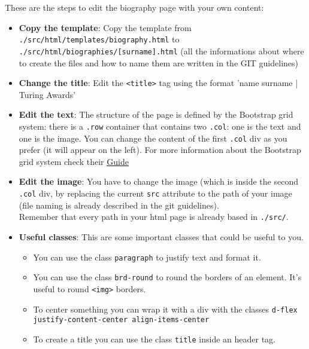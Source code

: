 \documentclass[a4paper,12pt]{article}
\newcommand{\<}{\textless}
\renewcommand{\>}{\textgreater}
\begin{document}
These are the steps to edit the biography page with your own content:
\begin{itemize}
 \item \textbf{Copy the template}: Copy the template from \\ \texttt{./src/html/templates/biography.html} to\\ \texttt{./src/html/biographies/[surname].html} (all the informations about where to create the files and how to name them are written in the GIT guidelines)
 
 \item \textbf{Change the title}: Edit the \texttt{\<title\>} tag using the format 'name surname | Turing Awards'
 
 \item \textbf{Edit the text}: The structure of the page is defined by the Bootstrap grid system: there is a \texttt{.row} container that contains two \texttt{.col}: one is the text and one is the image. You can change the content of the first \texttt{.col} div as you prefer (it will appear on the left). For more information about the Bootstrap grid system check their \href{https://getbootstrap.com/docs/5.1/layout/grid/}{Guide}
 
 \item \textbf{Edit the image}: You have to change the image (which is inside the second \texttt{.col} div, by replacing the current \texttt{src} attribute to the path of your image (file naming is already described in the git guidelines).\\ Remember that every path in your html page is already based in \texttt{./src/}.
 
 \item \textbf{Useful classes}: This are some important classes that could be useful to you.
    \begin{itemize}
     \item You can use the class \texttt{paragraph} to justify text and format it.
     \item You can use the class \texttt{brd-round} to round the borders of an element. It's useful to round \texttt{<img>} borders.
     \item To center something you can wrap it with a div with the classes \texttt{d-flex justify-content-center align-items-center}
     \item To create a title you can use the class \texttt{title} inside an header tag.
    \end{itemize}
 

\end{itemize}
\end{document}
